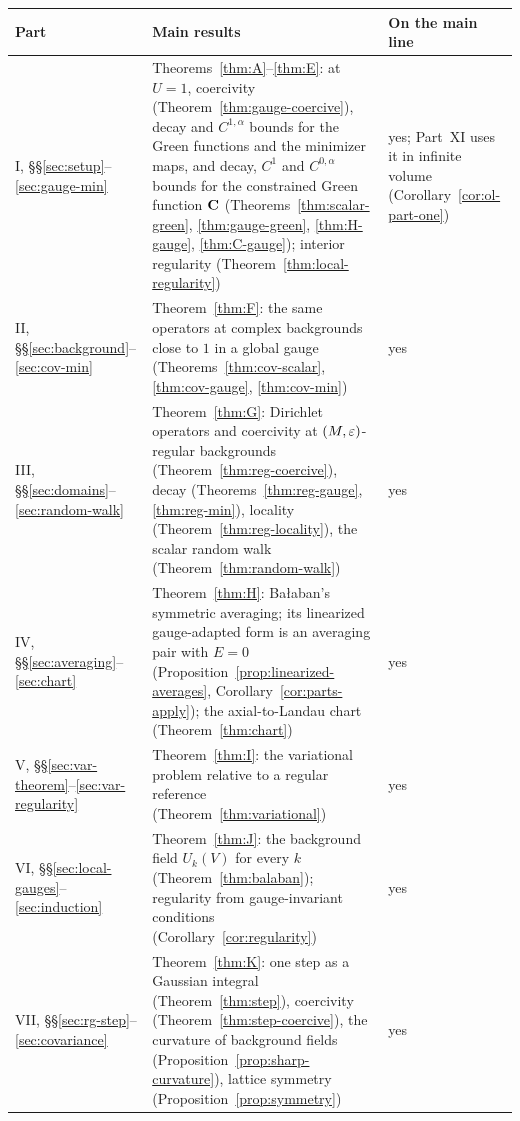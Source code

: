 \begin{table}[tbp]
\centering\small
\renewcommand{\arraystretch}{1.15}
\begin{tabular}{|p{}|p{}|p{}|}
\hline
Part & Main results & On the main line\tabularnewline
\hline
I, \S\S\ref{sec:setup}--\ref{sec:gauge-min} & \raggedright Theorems~\ref{thm:A}--\ref{thm:E}: at $U=1$, coercivity (Theorem~\ref{thm:gauge-coercive}), decay and $C^{1,\alpha}$ bounds for the Green functions and the minimizer maps, and decay, $C^1$ and $C^{0,\alpha}$ bounds for the constrained Green function $\mathbf C$ (Theorems~\ref{thm:scalar-green}, \ref{thm:gauge-green}, \ref{thm:H-gauge}, \ref{thm:C-gauge}); interior regularity (Theorem~\ref{thm:local-regularity}) & \raggedright yes; Part~XI uses it in infinite volume (Corollary~\ref{cor:ol-part-one})\tabularnewline
II, \S\S\ref{sec:background}--\ref{sec:cov-min} & \raggedright Theorem~\ref{thm:F}: the same operators at complex backgrounds close to $1$ in a global gauge (Theorems~\ref{thm:cov-scalar}, \ref{thm:cov-gauge}, \ref{thm:cov-min}) & yes\tabularnewline
III, \S\S\ref{sec:domains}--\ref{sec:random-walk} & \raggedright Theorem~\ref{thm:G}: Dirichlet operators and coercivity at $(M,\varepsilon)$-regular backgrounds (Theorem~\ref{thm:reg-coercive}), decay (Theorems~\ref{thm:reg-gauge}, \ref{thm:reg-min}), locality (Theorem~\ref{thm:reg-locality}), the scalar random walk (Theorem~\ref{thm:random-walk}) & yes\tabularnewline
IV, \S\S\ref{sec:averaging}--\ref{sec:chart} & \raggedright Theorem~\ref{thm:H}: Ba\l aban's symmetric averaging; its linearized gauge-adapted form is an averaging pair with $E=0$ (Proposition~\ref{prop:linearized-averages}, Corollary~\ref{cor:parts-apply}); the axial-to-Landau chart (Theorem~\ref{thm:chart}) & yes\tabularnewline
V, \S\S\ref{sec:var-theorem}--\ref{sec:var-regularity} & \raggedright Theorem~\ref{thm:I}: the variational problem relative to a regular reference (Theorem~\ref{thm:variational}) & yes\tabularnewline
VI, \S\S\ref{sec:local-gauges}--\ref{sec:induction} & \raggedright Theorem~\ref{thm:J}: the background field $U_k(V)$ for every $k$ (Theorem~\ref{thm:balaban}); regularity from gauge-invariant conditions (Corollary~\ref{cor:regularity}) & yes\tabularnewline
VII, \S\S\ref{sec:rg-step}--\ref{sec:covariance} & \raggedright Theorem~\ref{thm:K}: one step as a Gaussian integral (Theorem~\ref{thm:step}), coercivity (Theorem~\ref{thm:step-coercive}), the curvature of background fields (Proposition~\ref{prop:sharp-curvature}), lattice symmetry (Proposition~\ref{prop:symmetry}) & yes\tabularnewline

\end{tabular}
\end{table}
